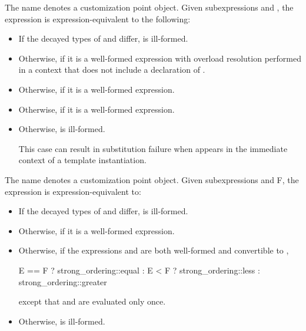 %
\pnum
The name  denotes
a customization point object.
Given subexpressions  and ,
the expression 
is expression-equivalent to the following:
\begin{itemize}
\item
  If the decayed types of  and  differ,
   is ill-formed.
\item
  Otherwise, 
  if it is a well-formed expression
  with overload resolution performed in a context
  that does not include a declaration of .
\item
  Otherwise, 
  if it is a well-formed expression.
\item
  Otherwise, 
  if it is a well-formed expression.
\item
  Otherwise,  is ill-formed.
  \begin{note}
  This case can result in substitution failure
  when 
  appears in the immediate context of a template instantiation.
\end{note}
\end{itemize}

%
\pnum
The name 
denotes a customization point object.
Given subexpressions  and {F},
the expression 
is expression-equivalent to:
\begin{itemize}
\item
  If the decayed types of  and  differ,
   is ill-formed.
\item
  Otherwise,  if it is a well-formed expression.
\item
  Otherwise, if the expressions  and 
  are both well-formed and convertible to ,
\begin{codeblock}
E == F ? strong_ordering::equal :
E < F  ? strong_ordering::less :
         strong_ordering::greater
\end{codeblock}
except that  and  are evaluated only once.
\item
Otherwise,  is ill-formed.
\end{itemize}

